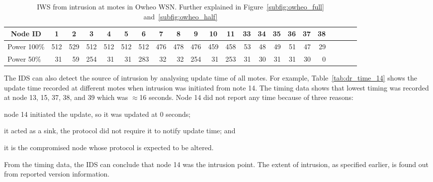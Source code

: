 \documentclass{CRPITStyle}
\newcommand*{\bd}[1]{\multicolumn{1}{|c|}{\bfseries #1}}
\begin{document}
\begin{table}[t!]
\centering
\begin{tabular}{|l|*{20}{r|}r|}
\hline
\bd{Node ID}           & \bd{1} & \bd{2} & \bd{3} & \bd{4} & \bd{5} & \bd{6} & \bd{7} & \bd{8} & \bd{9} & \bd{10} & \bd{11} &  \bd{33} & \bd{34} & \bd{35} & \bd{36} & \bd{37} & \bd{38} \\
\hline		\hline

Power 100\%	   & 512 & 529 & 512 & 512 & 512  & 512 & 476 & 478 & 476 & 459 & 458 & 53  & 48 & 49 & 51 & 47 & 29 \\
\hline

Power 50\%	  &31 & 59&254& 31& 31 &283& 32& 32& 254& 31 &253 &  31  & 30 & 31 & 31 & 30 & 0 \\
\hline
\end{tabular}
\caption{IWS from intrusion at motes in Owheo WSN. Further explained in Figure~\ref{subfig:owheo_full} and~\ref{subfig:owheo_half} }
\label{tab:owheo}
\end{table}


The IDS can also detect the source of intrusion by analysing update time of all motes. %
For example, Table~\ref{tab:dr_time_14} shows the update time recorded at different motes when intrusion was initiated from note 14.
The timing data shows that lowest timing was recorded at node 13, 15, 37, 38, and 39 which was $\approx$16 seconds.
Node 14 did not report any time because of three reasons: 
\begin{inparaenum}
\item node 14 initiated the update, so it was updated at $0$ seconds;
\item it acted as a sink, the protocol did not require it to notify update time; and 
\item it is the compromised node whose protocol is expected to be altered.
\end{inparaenum}
From the timing data, the IDS can conclude that node 14 was the intrusion point.
The extent of intrusion, as specified earlier, is found out from reported version information.
\end{document}
